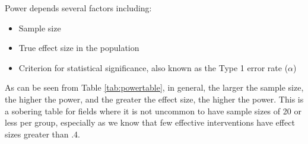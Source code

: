 \documentclass{krantz}
\providecommand{\tightlist}{%
\setlength{\itemsep}{0pt}\setlength{\parskip}{0pt}}
\begin{document}
Power depends several factors including:

\begin{itemize}
\tightlist
\item
  Sample size
\item
  True effect size in the population
\item
  Criterion for statistical significance, also known as the Type 1 error rate (\(\alpha\))
\end{itemize}

As can be seen from Table \ref{tab:powertable}, in general, the larger the sample size, the higher the power, and the greater the effect size, the higher the power. This is a sobering table for fields where it is not uncommon to have sample sizes of 20 or less per group, especially as we know that few effective interventions have effect sizes greater than .4.
\end{document}
